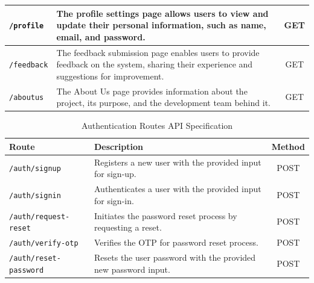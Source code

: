 \documentclass[12pt,oneside,openright,a4paper]{cpe-english-project}
\begin{document}
\begin{table}[h]
\begin{tabular}{|l|p{9cm}|c|}
\hline
\texttt{/profile} & The profile settings page allows users to view and update their personal information, such as name, email, and password. & GET \\
\hline
\texttt{/feedback} & The feedback submission page enables users to provide feedback on the system, sharing their experience and suggestions for improvement. & GET \\
\hline
\texttt{/aboutus} & The About Us page provides information about the project, its purpose, and the development team behind it. & GET \\
\hline
\end{tabular}
\label{tab:routes_overview}
\end{table}


\begin{table}[h]
\centering
\caption{Authentication Routes API Specification}
\begin{tabular}{|l|p{9cm}|c|}
\hline
\textbf{Route} & \textbf{Description} & \textbf{Method} \\
\hline
\texttt{/auth/signup} & Registers a new user with the provided input for sign-up. & POST \\
\hline
\texttt{/auth/signin} & Authenticates a user with the provided input for sign-in. & POST \\
\hline
\texttt{/auth/request-reset} & Initiates the password reset process by requesting a reset. & POST \\
\hline
\texttt{/auth/verify-otp} & Verifies the OTP for password reset process. & POST \\
\hline
\texttt{/auth/reset-password} & Resets the user password with the provided new password input. & POST \\
\hline
\end{tabular}
\label{tab:auth_post_routes}
\end{table}
\end{document}
